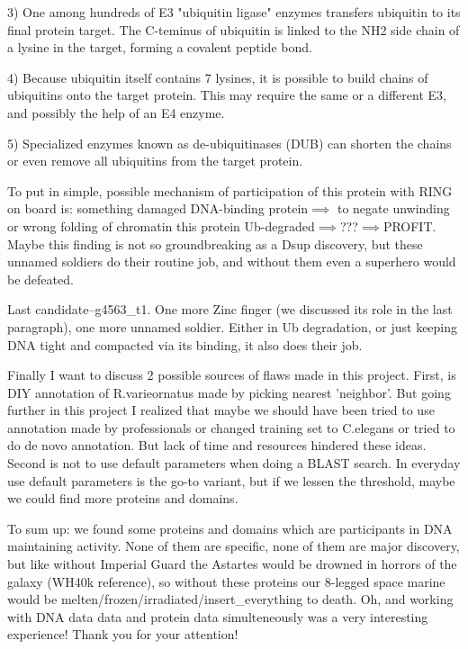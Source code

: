 \documentclass{article}
\begin{document}
 3) One among hundreds of E3 "ubiquitin ligase" enzymes transfers ubiquitin to its final protein target. The C-teminus of ubiquitin is linked to the NH2 side chain of a lysine in the target, forming a covalent peptide bond.
 
 4) Because ubiquitin itself contains 7 lysines, it is possible to build chains of ubiquitins onto the target protein. This may require the same or a different E3, and possibly the help of an E4 enzyme.
 
 5) Specialized enzymes known as de-ubiquitinases (DUB) can shorten the chains or even remove all ubiquitins from the target protein.
 
 To put in simple, possible mechanism of participation of this protein with RING on board is: something damaged DNA-binding protein$\implies$ to negate unwinding or wrong folding of chromatin this protein Ub-degraded$\implies$???$\implies$PROFIT. Maybe this finding is not so groundbreaking as a Dsup discovery, but these unnamed soldiers do their routine job, and without them even a superhero would be defeated.
 
 Last candidate--g4563_t1. One more Zinc finger (we discussed its role in the last paragraph), one more unnamed soldier. Either in Ub degradation, or just keeping DNA tight and compacted via its binding, it also does their job.
 
 Finally I want to discuss 2 possible sources of flaws made in this project. First, is DIY annotation of R.varieornatus made by picking nearest 'neighbor'. But going further in this project I realized that maybe we should have been tried to use annotation made by professionals or changed training set to C.elegans or tried to do de novo annotation. But lack of time and resources hindered these ideas. Second is not to use default parameters when doing a BLAST search. In everyday use default parameters is the go-to variant, but if we lessen the threshold, maybe we could find more proteins and domains.
 
 To sum up: we found some proteins and domains which are participants in DNA maintaining activity. None of them are specific, none of them are major discovery, but like without Imperial Guard the Astartes would be drowned in horrors of the galaxy (WH40k reference), so without these proteins our 8-legged space marine would be melten/frozen/irradiated/insert_everything to death. Oh, and working with DNA data data and protein data simulteneously was a very interesting experience!
 Thank you for your attention!
 
\end{document}
